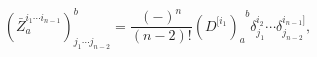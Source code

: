 \begin{equation}
\left( \bar{Z}_{a}^{i_{1}\cdots i_{n-1}}\right) _{j_{1}\cdots j_{n-2}}^{b}=%
\frac{\left( -\right) ^{n}}{\left( n-2\right) !}\left( D^{[i_{1}}\right)
_{a}^{\;\;b}\delta _{j_{1}}^{i_{2}}\cdots \delta _{j_{n-2}}^{i_{n-1}]},
\label{i31}
\end{equation}

